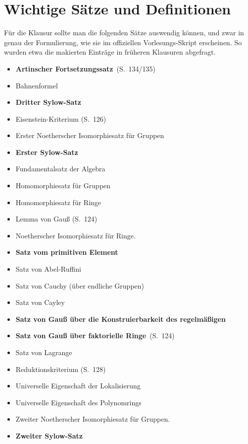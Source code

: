 \chapter*{Wichtige Sätze und Definitionen}

Für die Klausur sollte man die folgenden Sätze auswendig können, und zwar in genau der Formulierung, wie sie im offiziellen Vorlesungs-Skript erscheinen.
So wurden etwa die makierten Einträge in früheren Klausuren abgefragt.
\begin{itemize}
  \item
    \textbf{Artinscher Fortsetzungssatz}~(S.~134/135)
  \item
    Bahnenformel
  \item
    \textbf{Dritter Sylow-Satz}
  \item
    Eisenstein-Kriterium (S.~126)
  \item
    Erster Noetherscher Isomorphiesatz für Gruppen
  \item
    \textbf{Erster Sylow-Satz}
  \item
    Fundamentalsatz der Algebra
  \item
    Homomorphiesatz für Gruppen
  \item
    Homomorphiesatz für Ringe
  \item
    Lemma von Gauß (S.~124)
  \item
    Noetherscher Isomorphiesatz für Ringe.
  \item
    \textbf{Satz vom primitiven Element}
  \item
    Satz von Abel-Ruffini
  \item
    Satz von Cauchy (über endliche Gruppen)
  \item
    Satz von Cayley
  \item
    \textbf{Satz von Gauß über die Konstruierbarkeit des regelmäßigen~}
  \item
    \textbf{Satz von Gauß über faktorielle Ringe}~(S.~124)
  \item
    Satz von Lagrange
  \item
    Reduktionskriterium (S.~128)
  \item
    Universelle Eigenschaft der Lokalisierung
  \item
    Universelle Eigenschaft des Polynomrings
  \item
    Zweiter Noetherscher Isomorphiesatz für Gruppen.
  \item
    \textbf{Zweiter Sylow-Satz}
\end{itemize}

